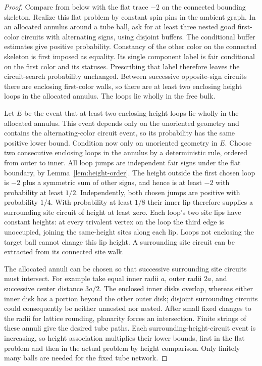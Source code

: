 \begin{proof}
Compare from below with the flat trace $-2$ on the connected bounding
skeleton.  Realize this flat problem by
constant spin pins in the ambient graph.  In an allocated annulus
around a tube ball, ask for at least three nested good first-color
circuits with alternating signs, using disjoint buffers.  The
conditional buffer estimates give positive probability.  Constancy
of the other color on the connected skeleton is first imposed as
equality.  Its single component label is fair conditional on the
first color and its statuses.  Prescribing that label therefore leaves
the circuit-search probability unchanged.  Between successive
opposite-sign circuits there are enclosing first-color
walls, so there are at least two enclosing height loops in the
allocated annulus.  The loops lie wholly in the free bulk.

Let $E$ be the event that at least two enclosing height loops lie
wholly in the allocated annulus.  This event depends only on the
unoriented geometry and contains the alternating-color circuit event,
so its probability has the same positive lower bound.  Condition now
only on unoriented geometry in $E$.  Choose two consecutive enclosing
loops in the annulus by a deterministic rule, ordered from outer to
inner.  All loop jumps are
independent fair signs under the flat boundary, by
Lemma~\ref{lem:height-order}.  The height outside the first chosen
loop is $-2$ plus a symmetric sum of other signs, and hence is at
least $-2$ with probability at least $1/2$.  Independently, both
chosen jumps are positive with probability $1/4$.  With probability
at least $1/8$ their inner lip therefore supplies a surrounding
site circuit of height at least zero.  Each loop's two site lips
have constant heights: at every trivalent vertex on the loop the
third edge is unoccupied, joining the same-height sites along each
lip.  Loops not enclosing the
target ball cannot change this lip height.  A surrounding site
circuit can be extracted from its connected site walk.

The allocated annuli can be chosen so that successive surrounding
site circuits must intersect.  For example take equal inner radii
$a$, outer radii $2a$, and successive center distance $3a/2$.
The enclosed inner disks overlap, whereas either inner disk has a
portion beyond the other outer disk; disjoint surrounding circuits
could consequently be neither unnested nor nested.  After small
fixed changes to the radii for lattice rounding, planarity forces
an intersection.  Finite strings of these annuli give the desired
tube paths.  Each surrounding-height-circuit event is increasing,
so height association multiplies their lower bounds, first in the
flat problem and then in the actual problem by height comparison.
Only finitely many balls are needed for the fixed tube network.
\end{proof}

